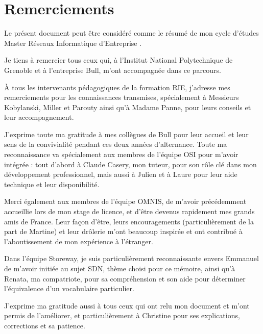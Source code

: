 \documentclass[a4paper,12pt,bibliography=totoc,index=totoc,twoside,francais]{scrbook}
\begin{document}


\frontmatter

\section*{Remerciements}

Le présent document peut être considéré comme le résumé de mon cycle d'études \og Master Réseaux Informatique d'Entreprise \fg{}.

Je tiens à  remercier tous ceux qui, à l'Institut National Polytechnique de Grenoble et à l'entreprise Bull, m'ont accompagnée dans ce parcours. 

À tous les intervenants pédagogiques de la formation RIE, j'adresse mes remerciements pour les connaissances transmises,  spécialement à Messieurs Kobylanski, Miller et Parouty ainsi qu'à Madame Panne, pour leurs conseils et leur accompagnement.

J'exprime toute ma gratitude à mes collègues de Bull pour leur accueil et leur sens de la convivialité pendant ces deux années d'alternance. Toute ma reconnaissance va spécialement aux membres de l'équipe OSI pour m'avoir intégrée : tout d'abord à Claude Casery, mon tuteur, pour son rôle clé dans mon développement professionnel, mais aussi à Julien et à Laure pour leur aide technique et leur disponibilité.

Merci également aux membres de l'équipe OMNIS, de m'avoir précédemment accueillie lors de mon stage de licence, et d'être devenus rapidement mes grands amis de France. Leur façon d'être, leurs encouragements (particulièrement de la part de Martine) et leur drôlerie m'ont beaucoup inspirée et ont contribué à l'aboutissement de mon expérience à l'étranger. 

Dans l'équipe Storeway, je suis particulièrement reconnaissante envers Emmanuel de m'avoir initiée au sujet SDN, thème choisi pour ce mémoire, ainsi qu'à Renata, ma compatriote, pour sa compréhension et son aide pour déterminer l'équivalence d'un vocabulaire particulier. 

J'exprime ma gratitude aussi à tous ceux qui ont relu mon document et m'ont permis de l'améliorer, et particulièrement à Christine pour ses explications, corrections et sa patience.
\end{document}
